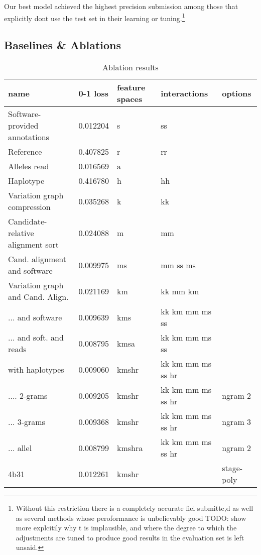 \documentclass{article}
\begin{document}
Our best model achieved the highest precision submission among those that explicitly dont use the test set in their learning or tuning.\footnote{ Without this restriction there is a completely accurate fiel submitte,d as well as several methods whose peroformance is unbelievably good TODO: show more explcitily why t is implausible, and where the degree to which the adjustments are tuned to produce good results in the evaluation set is left unsaid.}

\subsection{Baselines \& Ablations }
 

\begin{table}[]
  \centering
  \caption{Ablation results}
  \label{ablation-results}
  \begin{tabular}{|l|l|l|l|l|}
    \hline
    name & 0-1 loss & feature spaces & interactions & options \\ \hline
    Software-provided annotations & 0.012204 & s & ss & \\
    Reference  & 0.407825 & r & rr &\\
    Alleles read & 0.016569 & a & & \\
    Haplotype & 0.416780 & h & hh & \\
    Variation graph compression & 0.035268 & k & kk & \\
    Candidate-relative alignment sort & 0.024088 & m & mm & \\
    Cand. alignment and software & 0.009975 & ms & mm  ss  ms & \\
    Variation graph and Cand. Align. & 0.021169 & km & kk  mm  km & \\
    ... and software & 0.009639 & kms & kk  km  mm  ms  ss & \\
    ... and soft. and reads & 0.008795 & kmsa & kk  km  mm  ms  ss & \\
    with haplotypes & 0.009060 & kmshr & kk  km  mm  ms  ss  hr & \\
    .... 2-grams  & 0.009205 & kmshr & kk  km  mm  ms  ss  hr & ngram 2 \\
    ... 3-grams & 0.009368 & kmshr & kk  km  mm  ms  ss  hr & ngram 3 \\
    ... allel & 0.008799 & kmshra & kk  km  mm  ms  ss  hr & ngram 2 \\
    4b31 & 0.012261 & kmshr & & stage-poly \\
    \hline
  \end{tabular}
\end{table}
\end{document}
